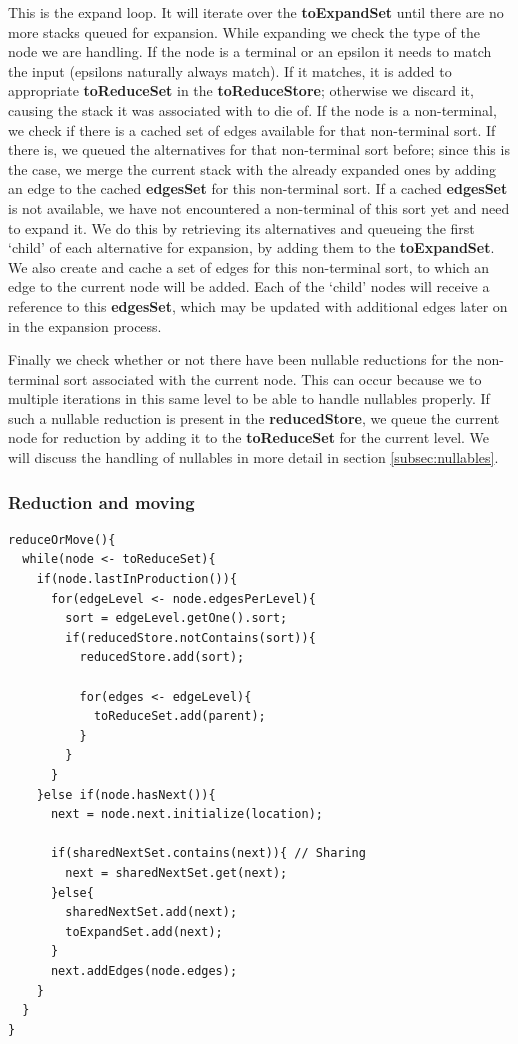 \documentclass[a4paper,10pt]{article}
\begin{document}
This is the expand loop. It will iterate over the {\bf toExpandSet} until there are no more stacks queued for expansion. While expanding we check the type of the node we are handling. If the node is a terminal or an epsilon it needs to match the input (epsilons naturally always match). If it matches, it is added to appropriate {\bf toReduceSet} in the {\bf toReduceStore}; otherwise we discard it, causing the stack it was associated with to die of. If the node is a non-terminal, we check if there is a cached set of edges available for that non-terminal sort. If there is, we queued the alternatives for that non-terminal sort before; since this is the case, we merge the current stack with the already expanded ones by adding an edge to the cached {\bf edgesSet} for this non-terminal sort. If a cached {\bf edgesSet} is not available, we have not encountered a non-terminal of this sort yet and need to expand it. We do this by retrieving its alternatives and queueing the first `child' of each alternative for expansion, by adding them to the {\bf toExpandSet}. We also create and cache a set of edges for this non-terminal sort, to which an edge to the current node will be added. Each of the `child' nodes will receive a reference to this {\bf edgesSet}, which may be updated with additional edges later on in the expansion process.

Finally we check whether or not there have been nullable reductions for the non-terminal sort associated with the current node. This can occur because we to multiple iterations in this same level to be able to handle nullables properly. If such a nullable reduction is present in the {\bf reducedStore}, we queue the current node for reduction by adding it to the {\bf toReduceSet} for the current level. We will discuss the handling of nullables in more detail in section \ref{subsec:nullables}.

\pagebreak
\subsubsection{Reduction and moving}
{\small
\begin{verbatim}
reduceOrMove(){
  while(node <- toReduceSet){
    if(node.lastInProduction()){
      for(edgeLevel <- node.edgesPerLevel){
        sort = edgeLevel.getOne().sort;
        if(reducedStore.notContains(sort)){
          reducedStore.add(sort);
          
          for(edges <- edgeLevel){
            toReduceSet.add(parent);
          }
        }
      }
    }else if(node.hasNext()){
      next = node.next.initialize(location);
      
      if(sharedNextSet.contains(next)){ // Sharing
        next = sharedNextSet.get(next);
      }else{
        sharedNextSet.add(next);
        toExpandSet.add(next);
      }
      next.addEdges(node.edges);
    }
  }
}
\end{verbatim}
}
\end{document}
